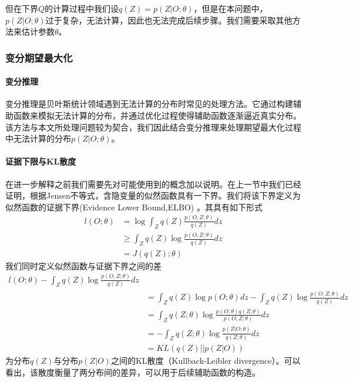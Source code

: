 但在下界$Q$的计算过程中我们设$q(Z)=p(Z|O;\theta)$，但是在本问题中，$p(Z|O;\theta)$过于复杂，无法计算，因此也无法完成后续步骤。我们需要采取其他方法来估计参数$\theta$。

\subsubsection{变分期望最大化}
\paragraph{变分推理}
变分推理是贝叶斯统计领域遇到无法计算的分布时常见的处理方法\cite{jordan_introduction_1999}。它通过构建辅助函数来模拟无法计算的分布，并通过优化过程使得辅助函数逐渐逼近真实分布。\cite{jaakkola_bayesian_2000}该方法与本文所处理问题较为契合，我们因此结合变分推理来处理期望最大化过程中无法计算的分布$p(Z|O;\theta)$。
\paragraph{证据下限与KL散度}

在进一步解释之前我们需要先对可能使用到的概念加以说明。在上一节中我们已经证明，根据Jensen不等式，含隐变量的似然函数具有一下界。我们将该下界定义为似然函数的证据下界(Evidence Lower Bound,ELBO)\cite{tzikas_variational_2008} 。其具有如下形式
\begin{equation}\begin{aligned}
l(O;\theta)
&=\log \int_Z q(Z)\frac{p(O,Z;\theta)}{q(Z)}dz\\
&\geq \int_Z q(Z) \log \frac{p(O,Z;\theta)}{q(Z)}dz\\
&=J(q(Z);\theta)
\end{aligned}\end{equation}
我们同时定义似然函数与证据下界之间的差
\begin{equation}\begin{aligned}
l(O;\theta) - \int_Z q(Z) \log \frac{p(O,Z;\theta)}{q(Z)}dz \\
&= \int_Zq(Z)\log p(O;\theta)dz- \int_Z q(Z) \log \frac{p(O,Z;\theta)}{q(Z)}dz\\
&=\int_Zq(Z;\theta)\log \frac{p(O;\theta)q(Z;\theta)}{p(O,Z;\theta)}dz\\
&=-\int_Zq(Z;\theta)\log \frac{p(Z|O;\theta)}{q(Z;\theta)}dz\\
&=KL(q(Z)||p(Z|O))
\end{aligned}\end{equation}
为分布$q(Z)$与分布$p(Z|O)$之间的KL散度（Kullback-Leibler divergence）\cite{neal_view_1998}。可以看出，该散度衡量了两分布间的差异，可以用于后续辅助函数的构造。

